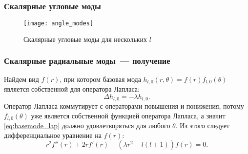 \documentclass{beamer}
\begin{document}
    \begin{frame}\frametitle{Скалярные угловые моды}

        \begin{figure}[h]
            \centering
            \texttt{[image: angle\_modes]}
            \caption[]{Скалярные угловые моды для нескольких $l$}
            \label{fig:angle_modes}
        \end{figure}

    \end{frame}


    \begin{frame}\frametitle{Скалярные радиальные моды~--- получение}

        Найдем вид $f(r)$, при котором базовая мода $h_{l,0}(r,\theta) = f(r) f_{l,0}(\theta)$ является собственной для оператора Лапласа:
        \begin{equation}\label{eq:basemode_lap}
            \Delta h_{l,0} = - \lambda h_{l,0} .
        \end{equation}
        Оператор Лапласа коммутирует с операторами повышения и понижения, потому $f_{l,0}(\theta)$ уже является собственной функцией оператора Лапласа, а значит \autoref{eq:basemode_lap} должно удовлетворяться для любого $\theta$. Из этого следует дифференциальное уравнение на $f(r)$:
        \begin{equation}
            r^2 f''(r) + 2 r f'(r) + (\lambda r^2 - l(l+1)) f(r) = 0 .
        \end{equation}

    \end{frame}

\end{document}
